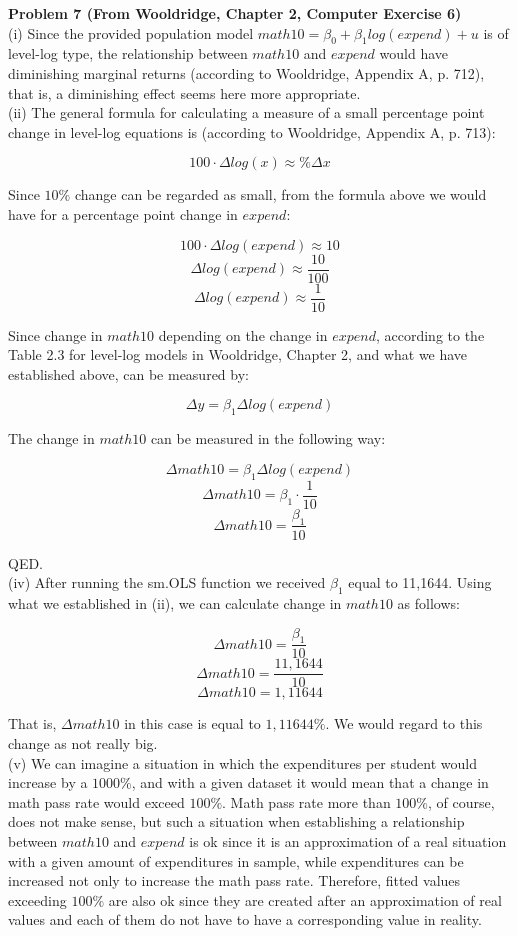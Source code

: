 \documentclass{article}
\begin{document}
\textbf{Problem 7 (From Wooldridge, Chapter 2, Computer Exercise 6)}
\\

(i) Since the provided population model $math10 = \beta_0 + \beta_1log(expend) + u$ is of level-log type, the relationship between $math10$ and $expend$ would have diminishing marginal returns (according to Wooldridge, Appendix A, p. 712), that is, a diminishing effect seems here more appropriate.
\\

(ii) The general formula for calculating a measure of a small percentage point change in level-log equations is (according to Wooldridge, Appendix A, p. 713):

$$100\cdot\Delta log(x)\approx\%\Delta x$$

Since $10\%$ change can be regarded as small, from the formula above we would have for a percentage point change in $expend$:

$$100\cdot\Delta log(expend) \approx 10$$
$$\Delta log(expend) \approx \frac{10}{100}$$
$$\Delta log(expend) \approx \frac{1}{10}$$

Since change in $math10$ depending on the change in $expend$, according to the Table 2.3 for level-log models in Wooldridge, Chapter 2, and what we have established above, can be measured by:

$$\Delta y = \beta_1 \Delta log(expend)$$

The change in $math10$ can be measured in the following way:

$$\Delta math10 = \beta_1 \Delta log(expend)$$
$$\Delta math10 = \beta_1 \cdot \frac{1}{10}$$
$$\Delta math10 = \frac{\beta_1}{10}$$

QED.
\\

(iv) After running the sm.OLS function we received $\beta_1$ equal to 11,1644. Using what we established in (ii), we can calculate change in $math10$ as follows:

$$\Delta math10 = \frac{\beta_1}{10}$$
$$\Delta math10 = \frac{11,1644}{10}$$
$$\Delta math10 = 1,11644$$

That is, $\Delta math10$ in this case is equal to $1,11644\%$. We would regard to this change as not really big.
\\

(v) We can imagine a situation in which the expenditures per student would increase by a $1000\%$, and with a given dataset it would mean that a change in math pass rate would exceed $100\%$. Math pass rate more than $100\%$, of course, does not make sense, but such a situation when establishing a relationship between $math10$ and $expend$ is ok since it is an approximation of a real situation with a given amount of expenditures in sample, while expenditures can be increased not only to increase the math pass rate. Therefore, fitted values exceeding $100\%$ are also ok since they are created after an approximation of real values and each of them do not have to have a corresponding value in reality.
\end{document}

